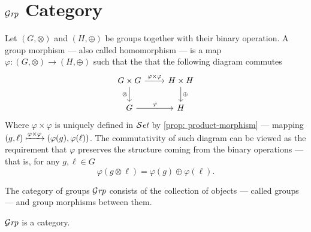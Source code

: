 \section{\texorpdfstring{\({\mathcal{G}\textit{rp}}\)}{Grp} Category}

\begin{definition}\label{def: grp-morphism}
  Let \((G, \otimes)\) and \((H, \oplus)\) be groups together with their binary
  operation. A group morphism --- also called homomorphism --- is a map
  \(\varphi: (G, \otimes) \to (H, \oplus)\) such that the
  that the following diagram commutes
  \[
    \begin{tikzcd}
      G \times G \ar[d, swap, "\otimes"] \ar[r, "\varphi \times \varphi"]
      &H \times H \ar[d, "\oplus"] \\
      G \ar[r, "\varphi"] &H
    \end{tikzcd}
  \]
  Where \(\varphi \times \varphi\) is uniquely defined in \({\mathcal{S}\textit{et}}\) by
  \cref{prop: product-morphism} --- mapping \((g, \ell) \xmapsto{\varphi \times
  \varphi} (\varphi(g), \varphi(\ell))\). The commutativity of such diagram can
  be viewed as the requirement that \(\varphi\) preserves the structure coming
  from the binary operations --- that is, for any \(g, \ell \in G\)
  \[
    \varphi(g \otimes \ell) = \varphi(g) \oplus \varphi(\ell).
  \]
\end{definition}

\begin{definition}\label{def: grp}
  The category of groups \({\mathcal{G}\textit{rp}}\) consists of the collection of objects ---
  called groups --- and group morphisms between them.
\end{definition}

\begin{proposition}
  \({\mathcal{G}\textit{rp}}\) is a category.
\end{proposition}

